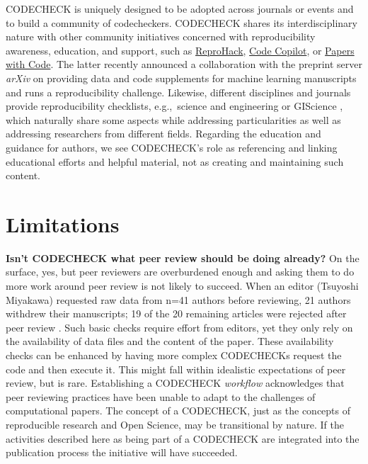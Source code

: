 \documentclass[12pt]{article}
\newcommand{\rev}[1]{\textit{#1}}
\begin{document}
CODECHECK is uniquely designed to be adopted across journals or events
and to build a community of codecheckers. CODECHECK shares its
interdisciplinary nature with other community initiatives concerned
with reproducibility awareness, education, and support, such as
\href{https://reprohack.github.io/reprohack-hq/}{ReproHack},
\href{https://twitter.com/Code_Copilot}{Code Copilot}, or
\href{https://paperswithcode.com/about}{Papers with Code}.
The latter recently announced a collaboration with the preprint server
\emph{arXiv} on providing data and code supplements for machine
learning manuscripts
and runs a reproducibility challenge.
Likewise, different disciplines and journals provide reproducibility
checklists, e.g.,~science and engineering \cite{rosenberg_next_2020} or
GIScience \cite{nust_agile_2019}, which naturally share some aspects
while addressing particularities as well as addressing researchers
from different fields. Regarding the education and guidance for
authors, we see CODECHECK's role as referencing and linking
educational efforts and helpful material, not as creating and
maintaining such content.

\section*{Limitations}\label{limitations}

\textbf{Isn't CODECHECK what peer review should be doing already?}  On
the surface, yes, but peer reviewers are overburdened enough and
asking them to do more work around peer review is not likely to
succeed.  When an editor (Tsuyoshi Miyakawa) requested raw data from
n=41 authors before reviewing, 21 authors withdrew their manuscripts;
19 of the 20 remaining articles were rejected after peer review
\cite{miyakawa_no_2020}.  Such basic checks require effort from
editors, yet they only rely on the availability of data files and the
content of the paper.  These availability checks can be enhanced by
having more complex CODECHECKs request the code and then execute it.
This might fall within idealistic expectations of peer review, but is
rare.  Establishing a CODECHECK \rev{workflow} acknowledges that peer
reviewing practices have been unable to adapt to the challenges of
computational papers.  The concept of a CODECHECK, just as the
concepts of reproducible research and Open Science, may be
transitional by nature. If the activities described here as being part
of a CODECHECK are integrated into the publication process the
initiative will have succeeded.
\end{document}
